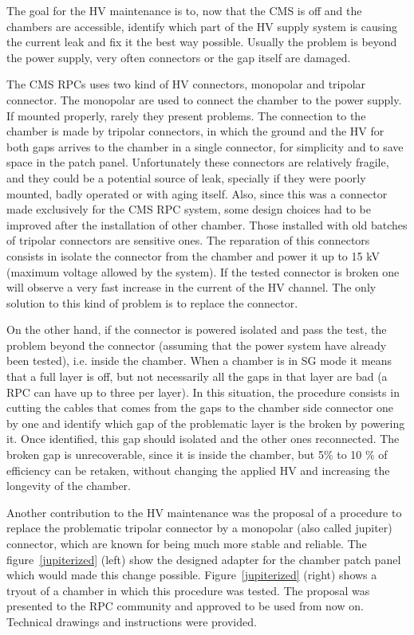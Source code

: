 The goal for the HV maintenance is to, now that the CMS is off and the chambers are accessible, identify which part of the HV supply system is causing the current leak and fix it the best way possible. Usually the problem is beyond the power supply, very often connectors or the gap itself are damaged.

The CMS RPCs uses two kind of HV connectors, monopolar and tripolar connector. The monopolar are used to connect the chamber to the power supply. If mounted properly, rarely they present problems. The connection to the chamber is made by tripolar connectors, in which the ground and the HV for both gaps arrives to the chamber in a single connector, for simplicity and to save space in the patch panel. Unfortunately these connectors are relatively fragile, and they could be a potential source of leak, specially if they were poorly mounted, badly operated or with aging itself. Also, since this was a connector made exclusively for the CMS RPC system, some design choices had to be improved after the installation of other chamber. Those installed with old batches of tripolar connectors are sensitive ones. The reparation of this connectors consists in isolate the connector from the chamber and power it up to 15 kV (maximum voltage allowed by the system). If the tested connector is broken one will observe a very fast increase in the current of the HV channel. The only solution to this kind of problem is to replace the connector.

On the other hand, if the connector is powered isolated and pass the test, the problem beyond the connector (assuming that the power system have already been tested), i.e. inside the chamber. When a chamber is in SG mode it means that a full layer is off, but not necessarily all the gaps in that layer are bad (a RPC can have up to three per layer). In this situation, the procedure consists in cutting the cables that comes from the gaps to the chamber side connector one by one and identify which gap of the problematic layer is the broken by powering it. Once identified, this gap should isolated and the other ones reconnected. The broken gap is unrecoverable, since it is inside the chamber, but 5\% to 10 \% of efficiency can be retaken, without changing the applied HV and increasing the longevity of the chamber.

Another contribution to the HV maintenance was the proposal of a procedure to replace the problematic tripolar connector by a monopolar (also called jupiter) connector, which are known for being much more stable and reliable. The figure~\ref{jupiterized} (left) show the designed adapter for the chamber patch panel which would made this change possible. Figure~\ref{jupiterized} (right) shows a tryout of a chamber in which this procedure was tested. The proposal was presented to the RPC community and approved to be used from now on. Technical drawings and instructions were provided.

